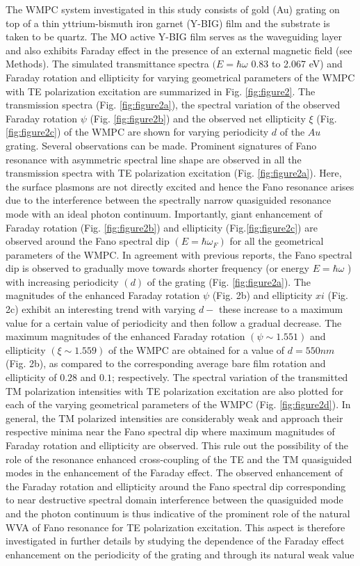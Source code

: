 \documentclass[13pt]{article}
\begin{document}
\FloatBarrier
	The WMPC system investigated in this study consists of gold (Au) grating on top of a thin yttrium-bismuth iron garnet (Y-BIG) film and the substrate is taken to be quartz. The MO active Y-BIG film serves as the waveguiding layer and also exhibits Faraday effect in the presence of an external magnetic field (see Methods). The simulated transmittance spectra $(E = \hbar \omega$ 0.83 to 2.067 eV) and Faraday rotation and ellipticity for varying geometrical parameters of the WMPC with TE polarization excitation are summarized in Fig. \ref{fig:figure2}. The transmission spectra (Fig. \ref{fig:figure2a}), the spectral variation of the observed Faraday rotation $\psi$ (Fig. \ref{fig:figure2b}) and the observed net ellipticity $\xi$ (Fig. \ref{fig:figure2c}) of the WMPC are shown for varying periodicity $d$ of the $Au$ grating. Several observations can be made. Prominent signatures of Fano resonance with asymmetric spectral line shape are observed in all the transmission spectra with TE polarization excitation (Fig. \ref{fig:figure2a}). Here, the surface plasmons are not directly excited and hence the Fano resonance arises due to the interference between the spectrally narrow quasiguided resonance mode with an ideal photon continuum. Importantly, giant enhancement of Faraday rotation (Fig. \ref{fig:figure2b}) and ellipticity (Fig.\ref{fig:figure2c}) are observed around the Fano spectral dip $(E = \hbar \omega_F )$ for all the geometrical parameters of the WMPC. In agreement with previous reports, the Fano spectral dip is observed to gradually move towards shorter frequency (or energy $E = \hbar \omega$ ) with increasing periodicity $(d)$ of the grating (Fig. \ref{fig:figure2a}). The magnitudes of the enhanced Faraday rotation $\psi$ (Fig. 2b) and ellipticity $xi$ (Fig. 2c) exhibit an interesting trend with varying $d-$ these increase to a maximum value for a certain value of periodicity and then follow a gradual decrease. The maximum magnitudes of the enhanced Faraday rotation $(\psi \sim 1.551)$ and ellipticity $(\xi \sim 1.559 )$ of the WMPC are obtained for a value of $d = 550 nm$ (Fig. 2b), as compared to the corresponding average bare film rotation and ellipticity of $0.28$ and $0.1$; respectively. The spectral variation of the transmitted TM polarization intensities with TE polarization excitation are also plotted for each of the varying geometrical parameters of the WMPC (Fig. \ref{fig:figure2d}). In general, the TM polarized intensities are considerably weak and approach their respective minima near the Fano spectral dip where maximum magnitudes of Faraday rotation and ellipticity are observed. This rule out the possibility of the role of the resonance enhanced cross-coupling of the TE and the TM quasiguided modes in the enhancement of the Faraday effect. The observed enhancement of the Faraday rotation and ellipticity around the Fano spectral dip corresponding to near destructive spectral domain interference between the quasiguided mode and the photon continuum is thus indicative of the prominent role of the natural WVA of Fano resonance for TE polarization excitation. This aspect is therefore investigated in further details by studying the dependence of the Faraday effect enhancement on the periodicity of the grating and through its natural weak value 
\end{document}
